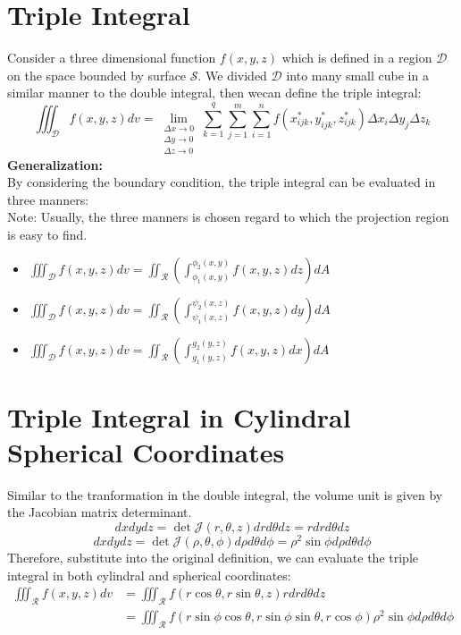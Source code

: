 \documentclass[UTF8,a4paper, 10pt, openany]{book}
\begin{document}
\section{Triple Integral}
Consider a three dimensional function $f(x,y,z)$ which is defined in a region $\mathcal{D}$ on the space bounded by surface $\mathcal{S}$. We divided $\mathcal{D}$ into many small cube in a similar manner to the double integral, then wecan define the triple integral:
$$\boxed{\iiint_{\mathcal{D}}f(x,y,z)dv=\lim_{\substack{\Delta x\to 0\\ \Delta y\to 0\\ \Delta z\to 0}}\sum_{k=1}^{q}\sum_{j=1}^{m}\sum_{i=1}^{n}f(x_{ijk}^*,y_{ijk}^*,z_{ijk}^*)\Delta x_{i}\Delta y_{j}\Delta z_{k}}$$
\textbf{Generalization:}\\
By considering the boundary condition, the triple integral can be evaluated in three manners:\\
Note: Usually, the three manners is chosen regard to which the projection region is easy to find.
\begin{itemize}
\item $\displaystyle\iiint_{\mathcal{D}}f(x,y,z)dv=\displaystyle\iint_{\mathcal{R}}\left(\int_{\phi_1(x,y)}^{\phi_2(x,y)}f(x,y,z)dz\right)dA$
\item $\displaystyle\iiint_{\mathcal{D}}f(x,y,z)dv=\displaystyle\iint_{\mathcal{R}}\left(\int_{\psi_1(x,z)}^{\psi_2(x,z)}f(x,y,z)dy\right)dA$
\item $\displaystyle\iiint_{\mathcal{D}}f(x,y,z)dv=\displaystyle\iint_{\mathcal{R}}\left(\int_{g_1(y,z)}^{g_2(y,z)}f(x,y,z)dx\right)dA$
\end{itemize}
\section{Triple Integral in Cylindral Spherical Coordinates}
Similar to the tranformation in the double integral, the volume unit is given by the Jacobian matrix determinant.
$$dxdydz=\det \mathcal{J}(r,\theta,z)drd\theta dz=rdrd\theta dz$$
$$dxdydz=\det \mathcal{J}(\rho,\theta,\phi)d\rho d\theta d\phi=\rho ^2\sin \phi d\rho d\theta d\phi$$
Therefore, substitute into the original definition, we can evaluate the triple integral in both cylindral and spherical coordinates:
\begin{align*}
\iiint_{\mathcal{R}}f(x,y,z)dv &=\iiint_{\mathcal{R}}f(r\cos \theta,r\sin \theta,z)rdrd\theta dz \\
&= \iiint_{\mathcal{R}}f(r\sin \phi \cos \theta,r\sin \phi \sin \theta,r\cos \phi)\rho ^2\sin \phi d\rho d\theta d\phi
\end{align*}
\end{document}
